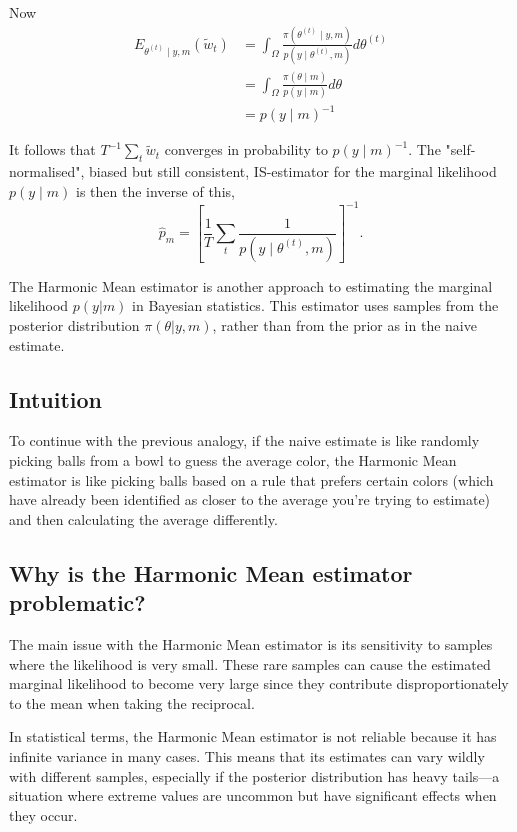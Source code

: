 \documentclass{article}
\begin{document}
Now
$$
\begin{aligned}
E_{\theta^{(t)} \mid y, m}\left(\tilde{w}_t\right) & =\int_{\Omega} \frac{\pi\left(\theta^{(t)} \mid y, m\right)}{p\left(y \mid \theta^{(t)}, m\right)} d \theta^{(t)} \\
& =\int_{\Omega} \frac{\pi(\theta \mid m)}{p(y \mid m)} d \theta \\
& =p(y \mid m)^{-1}
\end{aligned}
$$

It follows that $T^{-1} \sum_t \tilde{w}_t$ converges in probability to $p(y \mid m)^{-1}$. The "self-normalised", biased but still consistent, IS-estimator for the marginal likelihood $p(y \mid m)$ is then the inverse of this,
$$
\hat{p}_m=\left[\frac{1}{T} \sum_t \frac{1}{p\left(y \mid \theta^{(t)}, m\right)}\right]^{-1} .
$$

The Harmonic Mean estimator is another approach to estimating the marginal likelihood \( p(y|m) \) in Bayesian statistics. This estimator uses samples from the posterior distribution \( \pi(\theta|y,m) \), rather than from the prior as in the naive estimate.

\subsection{Intuition}
To continue with the previous analogy, if the naive estimate is like randomly picking balls from a bowl to guess the average color, the Harmonic Mean estimator is like picking balls based on a rule that prefers certain colors (which have already been identified as closer to the average you're trying to estimate) and then calculating the average differently.


\subsection{Why is the Harmonic Mean estimator problematic?}
The main issue with the Harmonic Mean estimator is its sensitivity to samples where the likelihood is very small. These rare samples can cause the estimated marginal likelihood to become very large since they contribute disproportionately to the mean when taking the reciprocal.

In statistical terms, the Harmonic Mean estimator is not reliable because it has infinite variance in many cases. This means that its estimates can vary wildly with different samples, especially if the posterior distribution has heavy tails—a situation where extreme values are uncommon but have significant effects when they occur.
\end{document}
